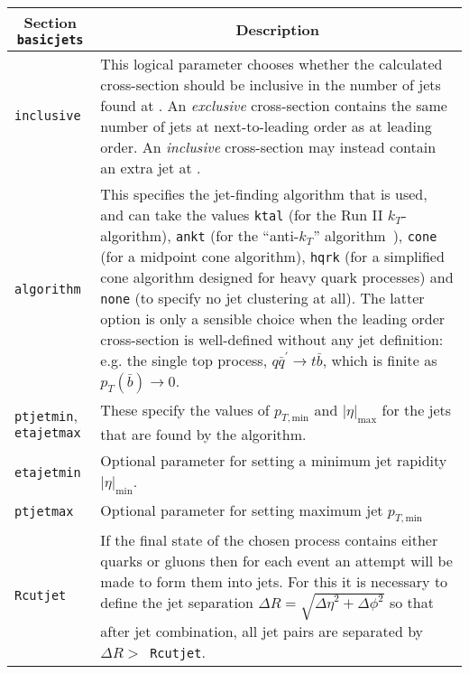 	\begin{longtable}{p{1.5cm}p{12cm}}
		\toprule
		\multicolumn{1}{c}{{\textbf{Section} \texttt{basicjets}}} & \multicolumn{1}{c}{{\textbf{Description}}} \\ 
		\midrule
		\texttt{inclusive} &
		This logical parameter chooses whether the
		calculated cross-section should be inclusive in the number of jets
		found at \NLO{}. An {\em exclusive}
		cross-section contains the same number of jets at next-to-leading
		order as at leading order. An {\em inclusive} cross-section may
		instead contain an extra jet at \NLO{}. \\
		\texttt{algorithm} &
		This specifies the jet-finding algorithm that
		is used, and can take the values
		{\tt ktal} (for the Run II $k_T$-algorithm), {\tt ankt} (for the
		``anti-$k_T$'' algorithm~\cite{Cacciari:2008gp}), {\tt cone} (for
		a midpoint cone algorithm), {\tt hqrk} (for a simplified cone
		algorithm designed for heavy quark processes) and {\tt none} (to
		specify no jet clustering at all). The latter option is only a
		sensible choice when the leading order cross-section is well-defined
		without any jet definition: e.g. the single top process,
		$q{\bar q^\prime} \to t{\bar b}$, which is finite as
		$p_T({\bar b}) \to 0$. \\
		\texttt{ptjetmin}, \texttt{etajetmax} &
		These specify the values
		of $p_{T,{\mathrm{min}}}$ and $|\eta|_{\mathrm{max}}$ for the
		jets that are found by the algorithm.  \\
		\texttt{etajetmin} &
		Optional parameter for setting a minimum jet rapidity $|\eta|_{\mathrm{min}}$. \\
		\texttt{ptjetmax} &
		Optional parameter for setting maximum jet $p_{T,{\mathrm{min}}}$\\
		\texttt{Rcutjet} &
		If the final state of the chosen process contains
		either quarks or gluons then for each event an attempt will be made
		to form them into jets. For this it is necessary to define the
		jet separation $\Delta R=\sqrt{{\Delta \eta}^2 + {\Delta \phi}^2}$
		so that after jet combination, all jet pairs are separated by
		$\Delta R >$~{\tt Rcutjet}.\\
		\bottomrule
	\end{longtable}
